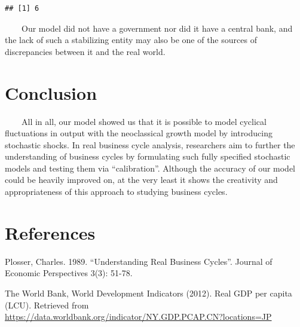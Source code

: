 \documentclass[
]{article}
\newenvironment{Shaded}{\begin{snugshade}}{\end{snugshade}}
\newcommand{\KeywordTok}[1]{\textcolor[rgb]{0.13,0.29,0.53}{\textbf{#1}}}
\newcommand{\NormalTok}[1]{#1}
\newcommand{\OperatorTok}[1]{\textcolor[rgb]{0.81,0.36,0.00}{\textbf{#1}}}
\begin{document}
\begin{Shaded}
\end{Shaded}

\begin{verbatim}
## [1] 6
\end{verbatim}

~~~~Our model did not have a government nor did it have a central bank,
and the lack of such a stabilizing entity may also be one of the sources
of discrepancies between it and the real world.

\hypertarget{conclusion}{%
\section{Conclusion}\label{conclusion}}

~~~~All in all, our model showed us that it is possible to model
cyclical fluctuations in output with the neoclassical growth model by
introducing stochastic shocks. In real business cycle analysis,
researchers aim to further the understanding of business cycles by
formulating such fully specified stochastic models and testing them via
``calibration''. Although the accuracy of our model could be heavily
improved on, at the very least it shows the creativity and
appropriateness of this approach to studying business cycles.

\hypertarget{references}{%
\section{References}\label{references}}

\setlength{\parindent}{-0.2in}
\setlength{\leftskip}{0.2in}
\setlength{\parskip}{8pt}

\noindent

Plosser, Charles. 1989. ``Understanding Real Business Cycles''. Journal
of Economic Perspectives 3(3): 51-78.

The World Bank, World Development Indicators (2012). Real GDP per capita
(LCU). Retrieved from
\url{https://data.worldbank.org/indicator/NY.GDP.PCAP.CN?locations=JP}
\end{document}
